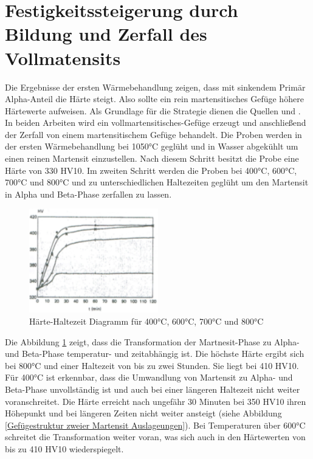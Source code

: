 \documentclass[a4paper, 11pt]{tubsreprt}
\begin{document}
\section{Festigkeitssteigerung durch Bildung und Zerfall des Vollmatensits}\label{Kapitel Bildung und Zerfall des Vollmartensits}
Die Ergebnisse der ersten Wärmebehandlung zeigen, dass mit sinkendem Primär Alpha-Anteil die Härte steigt. Also sollte ein rein martensitisches Gefüge höhere Härtewerte aufweisen. 
Als Grundlage für die Strategie dienen die Quellen \cite{Mur1995} und \cite{Tarin1995}. In beiden Arbeiten wird ein vollmartensitisches-Gefüge erzeugt und anschließend der Zerfall von einem martensitischem Gefüge behandelt. Die Proben werden in der ersten Wärmebehandlung bei 1050°C geglüht und in Wasser abgekühlt um einen reinen Martensit einzustellen. Nach diesem Schritt besitzt die Probe eine Härte von 330 HV10. Im zweiten Schritt werden die Proben bei 400°C, 600°C, 700°C und 800°C und zu unterschiedlichen Haltezeiten geglüht um den Martensit in Alpha und Beta-Phase zerfallen zu lassen. 

\begin{figure}
\centering
\includegraphics[width=0.5\textwidth]{Bilder/HaerteHaltezeitdiagramm.png}
\caption[Härte-Haltezeit Diagramm]{Härte-Haltezeit Diagramm für 400°C, 600°C, 700°C und 800°C \cite{Mur1995}}
\label{Härtehaltezeitdigramm}
\end{figure}

Die Abbildung \ref{Härtehaltezeitdigramm} zeigt, dass die Transformation der Martnesit-Phase zu Alpha- und Beta-Phase temperatur- und zeitabhängig ist. Die höchste Härte ergibt sich bei 800°C und einer Haltezeit von bis zu zwei Stunden. Sie liegt bei 410 HV10. Für 400°C ist erkennbar, dass die Umwandlung von Martensit zu Alpha- und Beta-Phase unvollständig ist und auch bei einer längeren Haltezeit nicht weiter voranschreitet. Die Härte erreicht nach ungefähr 30 Minuten bei 350 HV10 ihren Höhepunkt und bei längeren Zeiten nicht weiter ansteigt (siehe Abbildung \ref{Gefügestruktur zweier Martensit Auslageungen}). Bei Temperaturen über 600°C schreitet die Transformation weiter voran, was sich auch in den Härtewerten von bis zu 410 HV10 wiederspiegelt. 
\end{document}
